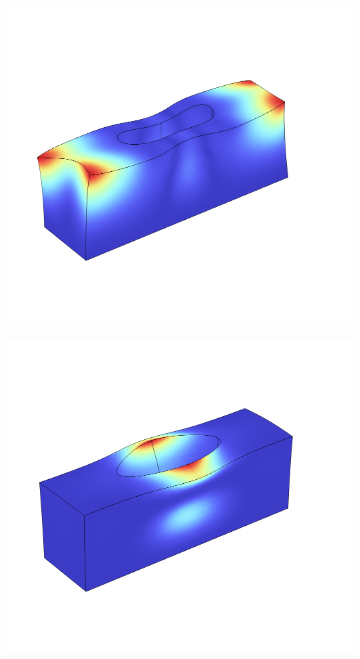 \begin{figure}[htpb]
	\begin{subfigure}[]{0.24\textwidth}
		\begin{center}
			\includegraphics[width=\textwidth]{chapters/theory/modeshape_5.png}
		\end{center}
		\subcaption{}%
		\label{fig:ms5}
	\end{subfigure}
	\begin{subfigure}[]{0.24\textwidth}
		\begin{center}
			\includegraphics[width=\textwidth]{chapters/theory/modeshape_6.png}

\end{center}
\end{subfigure}
\end{figure}
